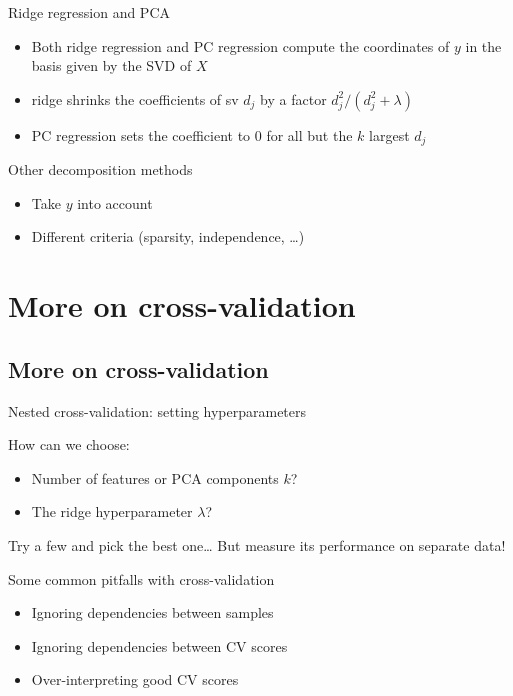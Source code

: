 \documentclass[presentation,mathserif,table]{beamer}
\begin{document}
\begin{frame}[label={sec:org8f3f308}]{Ridge regression and PCA}
\begin{itemize}
\item Both ridge regression and PC regression compute the coordinates of \(y\) in the basis given by the SVD of \(X\)
\item ridge shrinks the coefficients of sv \(d_j\) by a factor \(d_j^2 / (d_j^2 + \lambda)\)
\item PC regression sets the coefficient to 0 for all but the \(k\) largest \(d_j\)
\end{itemize}
\end{frame}
\begin{frame}[label={sec:orgdeef9e9}]{Other decomposition methods}
\begin{itemize}
\item Take \(y\) into account
\item Different criteria (sparsity, independence, \ldots{})
\end{itemize}
\end{frame}

\section{More on cross-validation}
\label{sec:org98c3a81}
\subsection{More on cross-validation}
\label{sec:org2ad84f6}


\begin{frame}[label={sec:org13b862c}]{Nested cross-validation: setting hyperparameters}
\begin{block}{How can we choose:}
\begin{itemize}
\item Number of features or PCA components \(k\)?
\item The ridge hyperparameter \(\lambda\)?
\end{itemize}

Try a few and pick the best one\ldots{}
But measure its performance on separate data!
\end{block}
\end{frame}
\begin{frame}[label={sec:org5b369a6}]{Some common pitfalls with cross-validation}
\begin{itemize}
\item Ignoring dependencies between samples
\item Ignoring dependencies between CV scores
\item Over-interpreting good CV scores
\end{itemize}
\end{frame}
\end{document}
